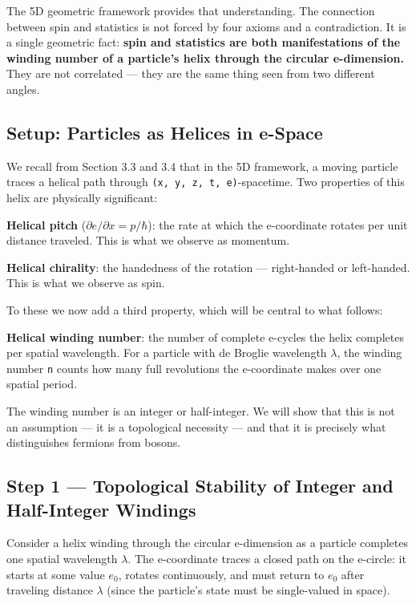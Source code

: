 \documentclass[aps,prd,preprint,superscriptaddress,longbibliography,floatfix]{revtex4-2}
\theoremstyle{remark}
\begin{document}
The 5D geometric framework provides that understanding. The connection between spin and statistics is not forced by four axioms and a contradiction. It is a single geometric fact: \textbf{spin and statistics are both manifestations of the winding number of a particle's helix through the circular e-dimension.} They are not correlated --- they are the same thing seen from two different angles.



\subsection{Setup: Particles as Helices in e-Space}

We recall from Section 3.3 and 3.4 that in the 5D framework, a moving particle traces a helical path through \texttt{(x, y, z, t, e)}-spacetime. Two properties of this helix are physically significant:

\textbf{Helical pitch} ($\partial e/\partial x = p/\hbar$): the rate at which the e-coordinate rotates per unit distance traveled. This is what we observe as momentum.

\textbf{Helical chirality}: the handedness of the rotation --- right-handed or left-handed. This is what we observe as spin.

To these we now add a third property, which will be central to what follows:

\textbf{Helical winding number}: the number of complete e-cycles the helix completes per spatial wavelength. For a particle with de Broglie wavelength $\lambda$, the winding number \texttt{n} counts how many full revolutions the e-coordinate makes over one spatial period.

The winding number is an integer or half-integer. We will show that this is not an assumption --- it is a topological necessity --- and that it is precisely what distinguishes fermions from bosons.



\subsection{Step 1 --- Topological Stability of Integer and Half-Integer Windings}

Consider a helix winding through the circular e-dimension as a particle completes one spatial wavelength $\lambda$. The e-coordinate traces a closed path on the e-circle: it starts at some value $e_{0}$, rotates continuously, and must return to $e_{0}$ after traveling distance $\lambda$ (since the particle's state must be single-valued in space).
\end{document}
